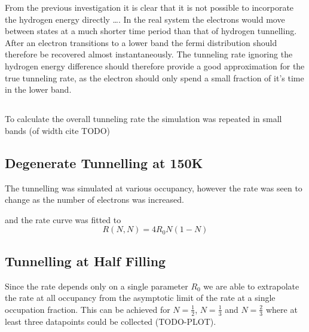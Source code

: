 
From the previous investigation it is clear
that it is not possible to incorporate the
hydrogen energy directly \ldots. In the
real system the electrons would move
between states at a much shorter time
period than that of hydrogen tunnelling.
After an electron transitions to a lower
band the fermi distribution should therefore
be recovered almost instantaneously.
The tunneling rate ignoring the
hydrogen energy difference should
therefore provide a good approximation
for the true tunneling rate, as the
electron should only spend a small
fraction of it's time in the lower band.

\subsection{}
To calculate the overall tunneling rate
the simulation was repeated in small
bands (of width cite TODO)




\subsection{Degenerate Tunnelling at 150K}
The tunnelling was simulated at various occupancy,
however the rate was seen to change as the
number of electrons was increased.

and the rate curve was fitted to
\begin{equation}
    R(N,N) = 4 R_0 N(1-N)\label{eqn:degenerate tunnelling rate}
\end{equation}

\subsection{Tunnelling at Half Filling}
Since the rate depends only on a single
parameter \(R_0\) we are able to
extrapolate the rate at all
occupancy from the asymptotic
limit of the rate at a single
occupation fraction. This can
be achieved for \(N=\frac{1}{2}\), \(N=\frac{1}{3}\)
and \(N=\frac{2}{3}\) where at
least three datapoints could
be collected (TODO-PLOT).

